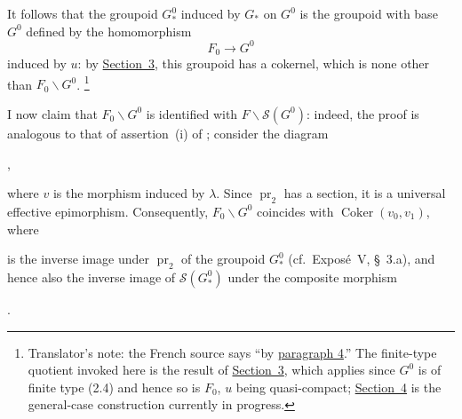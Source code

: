 It follows that the groupoid \(G^0_*\) induced by \(G_*\) on \(G^0\)
is the groupoid with base \(G^0\) defined by the homomorphism
\[
  F_0\longrightarrow G^0
\]
induced by \(u\): by \hyperref[sec:sga3-VIA-3]{Section~3}, this groupoid has a cokernel, which is none
other than \(F_0\backslash G^0\).%
\begingroup
\renewcommand{\thefootnote}{\fnsymbol{footnote}}%
\footnote[2]{Translator's note: the French source says
``by \hyperref[sec:sga3-VIA-4]{paragraph 4}.'' The finite-type quotient invoked here is the
result of \hyperref[sec:sga3-VIA-3]{Section~3}, which applies since \(G^0\) is of finite type (2.4) and
hence so is \(F_0\), \(u\) being quasi-compact; \hyperref[sec:sga3-VIA-4]{Section~4} is the general-case construction
currently in progress.}%
\endgroup

I now claim that \(F_0\backslash G^0\) is identified with
\(F\backslash\mathscr S(G^0)\): indeed, the proof is analogous to that of
assertion~(i) of ; consider
the diagram
\begin{center}
  \label{diag:sga3-VIA-4.3-span}%
  ,
\end{center}
where \(v\) is the morphism induced by \(\lambda\). Since
\(\operatorname{pr}_2\) has a section, it is a universal effective
epimorphism. Consequently, \(F_0\backslash G^0\) coincides with
\(\operatorname{Coker}(v_0,v_1)\), where
\begin{center}
  \label{diag:sga3-VIA-4.3-V-groupoid}%
\end{center}
is the inverse image under \(\operatorname{pr}_2\) of the groupoid
\(G^0_*\) (cf.\ Expos\'e~V, \S~3.a), and hence also the inverse image
of \(\mathscr S(G^0_*)\) under the composite morphism
\begin{center}
  \label{diag:sga3-VIA-4.3-composite}%
  .
\end{center}

